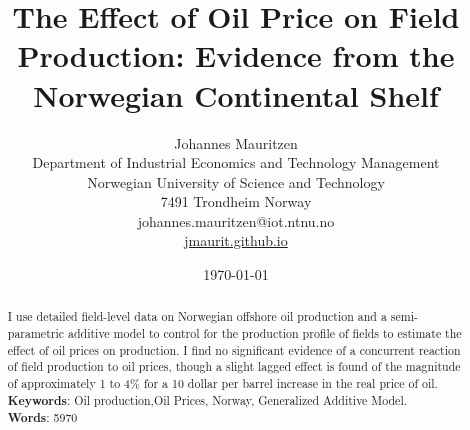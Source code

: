 \documentclass[12pt]{article}
\title{The Effect of Oil Price on Field Production: Evidence from the Norwegian Continental Shelf}
\author{Johannes Mauritzen\\
		Department of Industrial Economics and Technology Management\\
        Norwegian University of Science and Technology\\
        7491 Trondheim
        Norway\\
        johannes.mauritzen@iot.ntnu.no\\
        \url{jmaurit.github.io}\\
		}
\date{\today}
\begin{document}
	\maketitle

\begin{abstract}
I use detailed field-level data on Norwegian offshore oil production and a semi-parametric additive model to control for the production profile of fields to estimate the effect of oil prices on production.  I find no significant evidence of a concurrent reaction of field production to oil prices, though a slight lagged effect is found of the magnitude of approximately 1 to 4\% for a 10 dollar per barrel increase in the real price of oil.\\
\textbf{Keywords}: Oil production,Oil Prices, Norway, Generalized Additive Model.\\
\textbf{Words}: 5970
\end{abstract}
\end{document}
